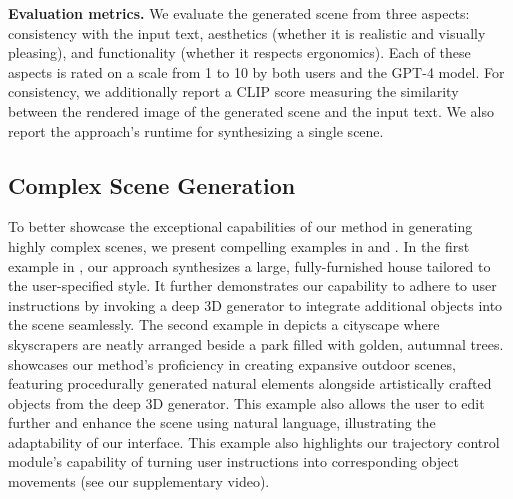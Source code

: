 \noindent\textbf{Evaluation metrics.}
We evaluate the generated scene from three aspects: consistency with the input text, aesthetics (whether it is realistic and visually pleasing), and functionality (whether it respects ergonomics). Each of these aspects is rated on a scale from 1 to 10 by both users and the GPT-4 model. For consistency, we additionally report a CLIP score measuring the similarity between the rendered image of the generated scene and the input text. We also report the approach's runtime for synthesizing a single scene.



\subsection{Complex Scene Generation}
To better showcase the exceptional capabilities of our method in generating highly complex scenes, we present compelling examples in  and .
%
In the first example in , our approach synthesizes a large, fully-furnished house tailored to the user-specified style. It further demonstrates our capability to adhere to user instructions by invoking a deep 3D generator to integrate additional objects into the scene seamlessly. The second example in  depicts a cityscape where skyscrapers are neatly arranged beside a park filled with golden, autumnal trees.
%
 showcases our method's proficiency in creating expansive outdoor scenes, featuring procedurally generated natural elements alongside artistically crafted objects from the deep 3D generator. This example also allows the user to edit further and enhance the scene using natural language, illustrating the adaptability of our interface.
This example also highlights our trajectory control module's capability of turning user instructions into corresponding object movements (see our supplementary video).


